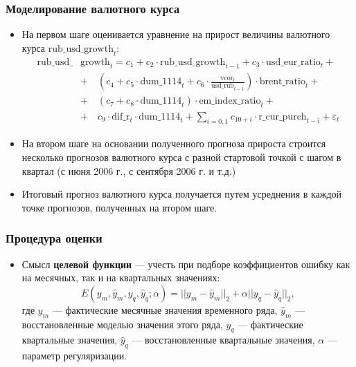 \documentclass[9pt]{beamer}
\newcommand{\lsum}{\sum\limits}
\begin{document}
\begin{frame}
	\frametitle{Моделирование валютного курса}
\begin{itemize}
	\item На первом шаге оценивается уравнение на прирост величины валютного курса $\text{rub\_usd\_growth}_{t}$:
\footnotesize
\begin{align*}
\text{rub\_usd\_}&\text{growth}_{t} = c_1 + c_2 \cdot \text{rub\_usd\_growth}_{t-1} + c_3 \cdot \text{usd\_eur\_ratio}_{t} + \\
& + \quad \left(c_4 + c_5 \cdot \text{dum\_1114}_t + c_6 \cdot \frac{\text{vcor}_t}{\text{usd\_rub}_{t-1}}\right)\cdot \text{brent\_ratio}_t + \\
&  + \quad (c_7  + c_8 \cdot \text{dum\_1114}_t)\cdot \text{em\_index\_ratio}_t + \\   
& + \quad c_9 \cdot \text{dif\_r}_t \cdot \text{dum\_1114}_t + 
\lsum_{i = 0, 1} c_{10+i}\cdot\text{r\_cur\_purch}_{t-i} + \varepsilon_{t}
\end{align*}
\normalsize
\item На втором шаге на основании полученного прогноза прироста строится несколько прогнозов валютного курса с разной стартовой точкой с шагом в квартал (с июня 2006 г., с сентября 2006 г. и т.д.)
\item Итоговый прогноз валютного курса получается путем усреднения в каждой точке прогнозов, полученных на втором шаге.

\end{itemize}
\end{frame}


\begin{frame}
	\frametitle{Процедура оценки}
\begin{itemize}
	\item Смысл \textbf{целевой функции} — учесть при подборе коэффициентов ошибку как на месячных, так и на квартальных значениях:
	\[
	E(y_m, \hat y_m, y_q, \hat y_q; \alpha) = || y_m - \hat y_m ||_2 + \alpha|| y_q - \hat y_q ||_2,
	\]
	где $y_m$ — фактические месячные значения временного ряда, $\hat y_m$ — восстановленные моделью значения этого ряда, $y_q$ — фактические квартальные значения, $\hat y_q$ — восстановленные квартальные значения, $\alpha$ — параметр регуляризации.
	
	
\end{itemize}

\end{frame}
\end{document}
